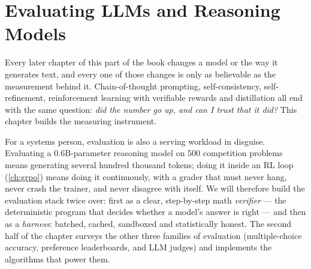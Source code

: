 \chapter{Evaluating LLMs and Reasoning Models}\label{ch:eval}

\providecommand{\bx}{\texttt{\textbackslash boxed\{\}}}

Every later chapter of this part of the book changes a model or the way it generates text, and
every one of those changes is only as believable as the measurement behind it. Chain-of-thought
prompting, self-consistency, self-refinement, reinforcement learning with verifiable rewards and
distillation all end with the same question: \emph{did the number go up, and can I trust that
it did?} This chapter builds the measuring instrument.

For a systems person, evaluation is also a serving workload in disguise. Evaluating a
0.6B-parameter reasoning model on 500 competition problems means generating several hundred
thousand tokens; doing it inside an RL loop (\cref{ch:grpo}) means doing it continuously, with
a grader that must never hang, never crash the trainer, and never disagree with itself. We will
therefore build the evaluation stack twice over: first as a clear, step-by-step math
\emph{verifier} --- the deterministic program that decides whether a model's answer is right ---
and then as a \emph{harness}: batched, cached, sandboxed and statistically honest. The second
half of the chapter surveys the other three families of evaluation (multiple-choice accuracy,
preference leaderboards, and LLM judges) and implements the algorithms that power them.

